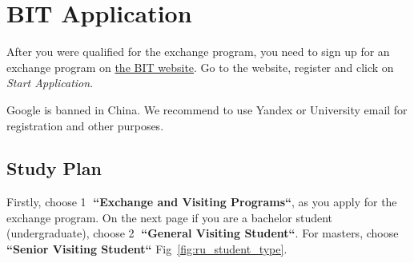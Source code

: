 



\chapter{BIT Application}\label{ch:ru_application}

After you were qualified for the exchange program,
you need to sign up for an exchange program on
\href{https://apply.isc.bit.edu.cn/apply/}{the BIT website}.
Go to the website,
register and click on \textit{Start Application}.

\begin{note}
    Google is banned in China.
    We recommend to use Yandex or University email
    for registration and other purposes.
\end{note}







\section{Study Plan}\label{sec:study_plan}

Firstly, choose \textcircled{1} \textbf{``Exchange and Visiting Programs``},
as you apply for the exchange program.
On the next page if you are a bachelor student (undergraduate),
choose \textcircled{2} \textbf{``General Visiting Student``}.
For masters, choose \textbf{``Senior Visiting Student``}
Fig~\ref{fig:ru_student_type}.


